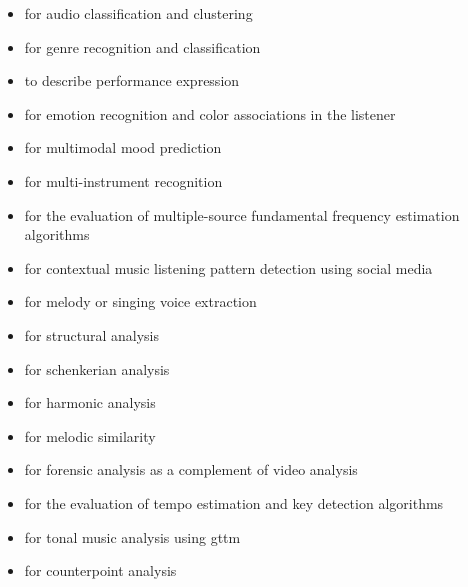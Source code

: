 \documentclass[
]{book}
\begin{document}
\begin{itemize}


\item for audio classification and clustering \parencites{ilprints489}{DBLP:conf/ismir/HomburgMMMW05}{marcelo_queiroz_2018_1422585}
\item for genre recognition and classification \parencites{Tza02:Mus}{DBLP:conf/icmc/XuZY05}{DBLP:conf/ismir/SillaKK08}{icmc/bbp2372.2010.003}{DBLP:journals/corr/abs-1803-04652}{DBLP:journals/corr/WangH17a}{DBLP:journals/corr/MitraS14}{2010NJPh:12e3030C}{DBLP:journals/corr/abs-0812-4235}

\item to describe performance expression \parencites{DBLP:conf/ismir/HashidaMK08}{mitsuyo_hashida_2017_1401963}{mitsuyo_hashida_2018_1422503}
\item for emotion recognition and color associations in the listener \parencite{DBLP:conf/ismir/PesekGPSGSPM14}
\item for multimodal mood prediction \parencites{DBLP:journals/corr/abs-1809-07276}{xiao_hu_2014_850795}{humberto_corona_2015_851021}


\item for multi-instrument recognition \parencite{DBLP:conf/ismir/HumphreyDM18}
\item for the evaluation of multiple-source fundamental frequency estimation algorithms \parencite{DBLP:conf/ismir/YehBR07}
\item for contextual music listening pattern detection using social media \parencite{DBLP:conf/ismir/HaugerSKT13}
\item for melody \parencites{ioannis_karydis_2007_849469}{DBLP:conf/ismir/BittnerSTMCB14} or singing voice \parencite{DBLP:journals/corr/abs-1711-00048} extraction


\item for structural analysis \parencite{DBLP:conf/ismir/SmithBFRD11}
\item for schenkerian analysis \parencite{DBLP:conf/ismir/Kirlin14}
\item for harmonic analysis \parencite{DBLP:conf/ismir/DevaneyACN15}
\item for melodic similarity \parencite{goffredo_haus_2005_849297}
\item for forensic analysis as a complement of video analysis \parencite{serizel:hal-01393959}
\item for the evaluation of tempo estimation and key detection algorithms \parencite{DBLP:conf/ismir/KneesFHVBHG15}
\item for tonal music analysis using \gls{gttm} \parencite{DBLP:conf/ismir/HamanakaHT14}
\item for counterpoint analysis \parencite{DBLP:conf/ismir/AntilaC14}



\end{itemize}
\end{document}
